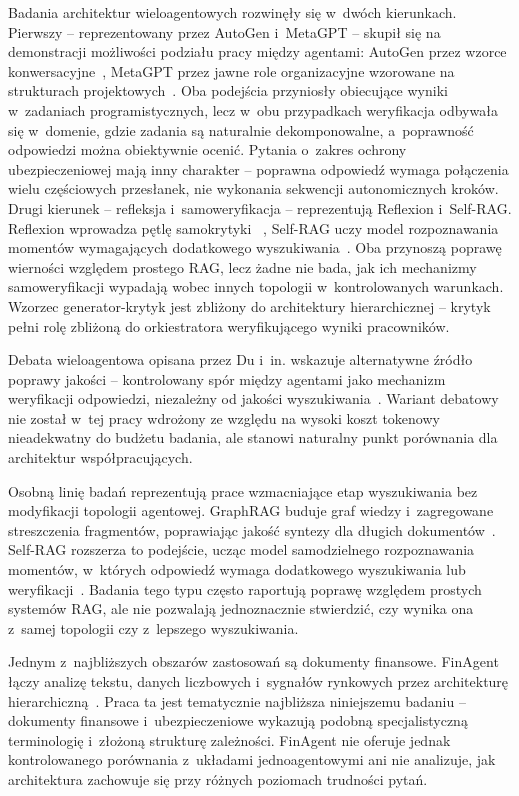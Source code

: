 Badania architektur wieloagentowych rozwinęły się w~dwóch kierunkach. Pierwszy
-- reprezentowany przez AutoGen i~MetaGPT -- skupił się na demonstracji
możliwości podziału pracy między agentami: AutoGen przez wzorce
konwersacyjne~\cite{wu2024autogen}, MetaGPT przez jawne role organizacyjne
wzorowane na strukturach projektowych~\cite{hong2023metagpt}. Oba podejścia
przyniosły obiecujące wyniki w~zadaniach programistycznych, lecz w~obu
przypadkach weryfikacja odbywała się w~domenie, gdzie zadania są naturalnie
dekomponowalne, a~poprawność odpowiedzi można obiektywnie ocenić. Pytania
o~zakres ochrony ubezpieczeniowej mają inny charakter -- poprawna odpowiedź
wymaga połączenia wielu częściowych przesłanek, nie wykonania sekwencji
autonomicznych kroków. Drugi kierunek -- refleksja i~samoweryfikacja --
reprezentują Reflexion i~Self-RAG. Reflexion wprowadza pętlę samokrytyki
~\cite{shinn2024reflexion}, Self-RAG uczy model rozpoznawania momentów
wymagających dodatkowego wyszukiwania~\cite{asai2023self}. Oba przynoszą
poprawę wierności względem prostego RAG, lecz żadne nie bada, jak ich
mechanizmy samoweryfikacji wypadają wobec innych topologii w~kontrolowanych
warunkach. Wzorzec generator-krytyk jest zbliżony do architektury
hierarchicznej -- krytyk pełni rolę zbliżoną do orkiestratora weryfikującego
wyniki pracowników.

Debata wieloagentowa opisana przez Du i~in. wskazuje alternatywne źródło
poprawy jakości -- kontrolowany spór między agentami jako mechanizm weryfikacji
odpowiedzi, niezależny od jakości wyszukiwania~\cite{du2024improving}. Wariant
debatowy nie został w~tej pracy wdrożony ze względu na wysoki koszt tokenowy
nieadekwatny do budżetu badania, ale stanowi naturalny punkt porównania dla
architektur współpracujących.

Osobną linię badań reprezentują prace wzmacniające etap wyszukiwania bez
modyfikacji topologii agentowej. GraphRAG buduje graf wiedzy i~zagregowane
streszczenia fragmentów, poprawiając jakość syntezy dla długich
dokumentów~\cite{edge2024local}. Self-RAG rozszerza to podejście, ucząc model
samodzielnego rozpoznawania momentów, w~których odpowiedź wymaga dodatkowego
wyszukiwania lub weryfikacji~\cite{asai2023self}. Badania tego typu często
raportują poprawę względem prostych systemów RAG, ale nie pozwalają
jednoznacznie stwierdzić, czy wynika ona z~samej topologii czy z~lepszego
wyszukiwania.

Jednym z~najbliższych obszarów zastosowań są dokumenty finansowe. FinAgent
łączy analizę tekstu, danych liczbowych i~sygnałów rynkowych przez architekturę
hierarchiczną~\cite{zhang2024multimodal}. Praca ta jest tematycznie najbliższa
niniejszemu badaniu -- dokumenty finansowe i~ubezpieczeniowe wykazują podobną
specjalistyczną terminologię i~złożoną strukturę zależności. FinAgent nie
oferuje jednak kontrolowanego porównania z~układami jednoagentowymi ani nie
analizuje, jak architektura zachowuje się przy różnych poziomach trudności
pytań.

